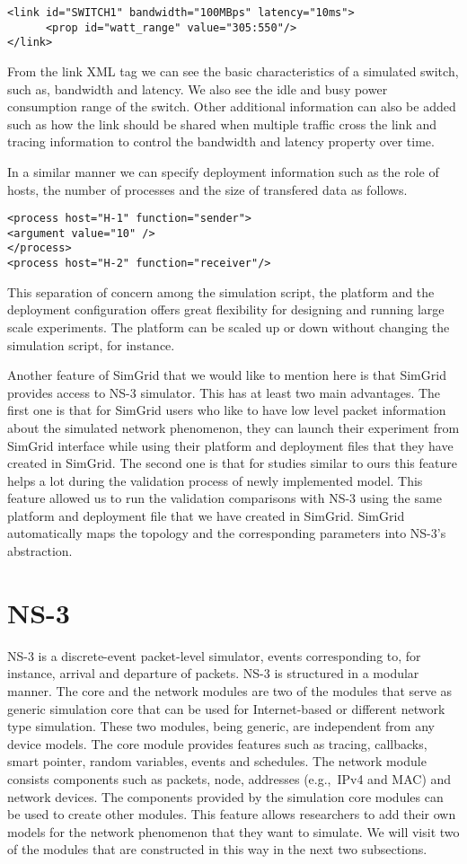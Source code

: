 \begin{lstlisting}
<link id="SWITCH1" bandwidth="100MBps" latency="10ms">
      <prop id="watt_range" value="305:550"/>
</link>
\end{lstlisting}

From the link XML tag we can see the basic characteristics of a simulated switch, such as, bandwidth and latency. We also see the idle and busy power consumption range of the switch. Other additional information can also be added such as how the link should be shared when multiple traffic cross the link and tracing information to control the bandwidth and latency property over time. 

In a similar manner we can specify deployment information such as the role of hosts, the number of processes and the size of transfered data as follows. 
\begin{lstlisting}
<process host="H-1" function="sender">
<argument value="10" />
</process>
<process host="H-2" function="receiver"/>
\end{lstlisting}
This separation of concern among the simulation script, the platform and the deployment configuration offers great flexibility for designing and running large scale experiments. The platform can be scaled up or down without changing the simulation script, for instance. 

Another feature of SimGrid that we would like to mention here is that SimGrid provides access to NS-3 simulator. This has at least two main advantages. The first one is that for SimGrid users who like to have low level packet information about the simulated network phenomenon, they can launch their experiment from SimGrid interface while using their platform and deployment files that they have created in SimGrid. The second one is that for studies similar to ours this feature helps a lot during the validation process of newly implemented model. This feature allowed us to run the validation comparisons with NS-3 using the same platform and deployment file that we have created in SimGrid. SimGrid automatically maps the topology and the corresponding parameters into NS-3's abstraction.
\section{NS-3}
NS-3 is a discrete-event packet-level simulator, events corresponding to, for instance, arrival and departure of packets. NS-3 is structured in a modular manner. The core and the network modules are two of the modules that serve as generic simulation core that can be used for Internet-based or different network type simulation. These two modules, being generic, are independent from any device models. The core module provides features such as tracing, callbacks, smart pointer, random variables, events and schedules. The network module consists components such as packets, node, addresses (e.g.,~IPv4 and MAC) and network devices. The components provided by the simulation core modules can be used to create other modules. This feature allows researchers to add their own models for the network phenomenon that they want to simulate. We will visit two of the modules that are constructed in this way in the next two subsections\cite{ns3}. 

